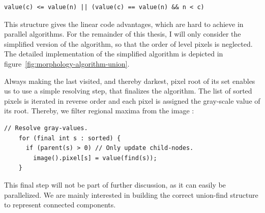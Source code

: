 \begin{lstlisting}[style=inline]
  value(c) <= value(n) || (value(c) == value(n) && n < c)
\end{lstlisting}

This structure gives the linear code advantages, which are hard to achieve in
parallel algorithms. For the remainder of this thesis, I will only consider the
simplified version of the algorithm, so that the order of level pixels is
neglected. The detailed implementation of the simplified 
algorithm is depicted in figure~\ref{fig:morphology-algorithm-union}.

Always making the last visited, and thereby darkest, pixel root of its set
enables us to use a simple resolving step, that finalizes the algorithm. The
list of sorted pixels is iterated in reverse order and each pixel is assigned
the gray-scale value of its root. Thereby, we filter regional maxima from the
image \cite{Meijster2002Comparison}:

\begin{lstlisting}[frame=L]
    // Resolve gray-values.
    for (final int s : sorted) {
      if (parent(s) > 0) // Only update child-nodes.
        image().pixel[s] = value(find(s));
    }
\end{lstlisting}

This final step will not be part of further discussion, as it can easily be
parallelized. We are mainly interested in building the correct union-find
structure to represent connected components.


